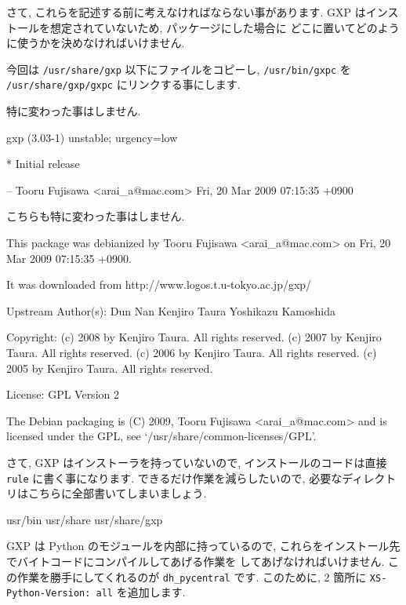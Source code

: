 \documentclass[mingoth,a4paper]{jsarticle}
\begin{document}
さて, これらを記述する前に考えなければならない事があります.
GXP はインストールを想定されていないため, パッケージにした場合に
どこに置いてどのように使うかを決めなければいけません.

今回は \verb|/usr/share/gxp| 以下にファイルをコピーし,
\verb|/usr/bin/gxpc| を \verb|/usr/share/gxp/gxpc| にリンクする事にします.


特に変わった事はしません.

\begin{commandline}
gxp (3.03-1) unstable; urgency=low

  * Initial release

 -- Tooru Fujisawa <arai_a@mac.com>  Fri, 20 Mar 2009 07:15:35 +0900
\end{commandline}


こちらも特に変わった事はしません.

\begin{commandline}
This package was debianized by Tooru Fujisawa <arai_a@mac.com> on
Fri, 20 Mar 2009 07:15:35 +0900.

It was downloaded from http://www.logos.t.u-tokyo.ac.jp/gxp/

Upstream Author(s): 
    Dun Nan
    Kenjiro Taura 
    Yoshikazu Kamoshida 

Copyright:
    (c) 2008 by Kenjiro Taura. All rights reserved.
    (c) 2007 by Kenjiro Taura. All rights reserved.
    (c) 2006 by Kenjiro Taura. All rights reserved.
    (c) 2005 by Kenjiro Taura. All rights reserved.

License:
    GPL Version 2

The Debian packaging is (C) 2009, Tooru Fujisawa <arai_a@mac.com> and
is licensed under the GPL, see `/usr/share/common-licenses/GPL'.
\end{commandline}


さて, GXP はインストーラを持っていないので,
インストールのコードは直接 \verb|rule| に書く事になります.
できるだけ作業を減らしたいので, 必要なディレクトリはこちらに全部書いてしまいましょう.

\begin{commandline}
usr/bin
usr/share
usr/share/gxp
\end{commandline}


GXP は Python のモジュールを内部に持っているので,
これらをインストール先でバイトコードにコンパイルしてあげる作業を
してあげなければいけません.
この作業を勝手にしてくれるのが \verb|dh_pycentral| です.
このために, 2 箇所に \verb|XS-Python-Version: all| を追加します.
\end{document}
